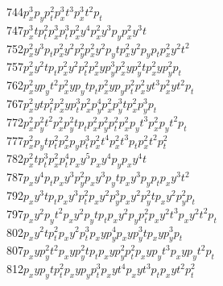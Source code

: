 \begin{tabbing}
744\>$p_x^3 p_yp_t^2    $\>$p_x^3 t  ^3       $\>$p_x^3 t  ^2 p_t   $\\
747\>$p_x^3 t  p_t^2    $\>$p_x^3 p_t^3       $\>$p_x^2 y  ^4       $\>$p_x^2 y  ^3 p_y   $\>$p_x^2 y  ^3 t     $\\
752\>$p_x^2 y  ^3 p_t   $\>$p_x^2 y  ^2 p_y^2 $\>$p_x^2 y  ^2 p_yt  $\>$p_x^2 y  ^2 p_yp_t$\>$p_x^2 y  ^2 t  ^2 $\\
757\>$p_x^2 y  ^2 t  p_t$\>$p_x^2 y  ^2 p_t^2 $\>$p_x^2 y  p_y^3    $\>$p_x^2 y  p_y^2 t  $\>$p_x^2 y  p_y^2 p_t$\\
762\>$p_x^2 y  p_yt  ^2 $\>$p_x^2 y  p_yt  p_t$\>$p_x^2 y  p_yp_t^2 $\>$p_x^2 y  t  ^3    $\>$p_x^2 y  t  ^2 p_t$\\
767\>$p_x^2 y  t  p_t^2 $\>$p_x^2 y  p_t^3    $\>$p_x^2 p_y^4       $\>$p_x^2 p_y^3 t     $\>$p_x^2 p_y^3 p_t   $\\
772\>$p_x^2 p_y^2 t  ^2 $\>$p_x^2 p_y^2 t  p_t$\>$p_x^2 p_y^2 p_t^2 $\>$p_x^2 p_yt  ^3    $\>$p_x^2 p_yt  ^2 p_t$\\
777\>$p_x^2 p_yt  p_t^2 $\>$p_x^2 p_yp_t^3    $\>$p_x^2 t  ^4       $\>$p_x^2 t  ^3 p_t   $\>$p_x^2 t  ^2 p_t^2 $\\
782\>$p_x^2 t  p_t^3    $\>$p_x^2 p_t^4       $\>$p_xy  ^5          $\>$p_xy  ^4 p_y      $\>$p_xy  ^4 t        $\\
787\>$p_xy  ^4 p_t      $\>$p_xy  ^3 p_y^2    $\>$p_xy  ^3 p_yt     $\>$p_xy  ^3 p_yp_t   $\>$p_xy  ^3 t  ^2    $\\
792\>$p_xy  ^3 t  p_t   $\>$p_xy  ^3 p_t^2    $\>$p_xy  ^2 p_y^3    $\>$p_xy  ^2 p_y^2 t  $\>$p_xy  ^2 p_y^2 p_t$\\
797\>$p_xy  ^2 p_yt  ^2 $\>$p_xy  ^2 p_yt  p_t$\>$p_xy  ^2 p_yp_t^2 $\>$p_xy  ^2 t  ^3    $\>$p_xy  ^2 t  ^2 p_t$\\
802\>$p_xy  ^2 t  p_t^2 $\>$p_xy  ^2 p_t^3    $\>$p_xy  p_y^4       $\>$p_xy  p_y^3 t     $\>$p_xy  p_y^3 p_t   $\\
807\>$p_xy  p_y^2 t  ^2 $\>$p_xy  p_y^2 t  p_t$\>$p_xy  p_y^2 p_t^2 $\>$p_xy  p_yt  ^3    $\>$p_xy  p_yt  ^2 p_t$\\
812\>$p_xy  p_yt  p_t^2 $\>$p_xy  p_yp_t^3    $\>$p_xy  t  ^4       $\>$p_xy  t  ^3 p_t   $\>$p_xy  t  ^2 p_t^2 $\\

\end{tabbing}
